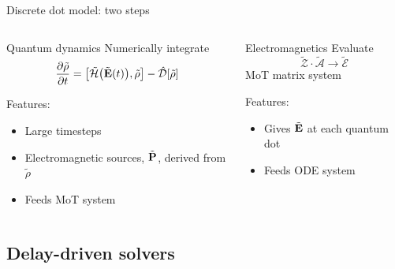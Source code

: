 \documentclass[aspectratio=169, usenames, dvipsnames]{beamer}
\begin{document}
\begin{frame}{Discrete dot model: two steps}
  \begin{columns}
    \begin{column}{0.5\textwidth}
      \begin{block}{Quantum dynamics}
        Numerically integrate
        \begin{equation*}
          \pdv{\tilde{\rho}}{t} = \commutator{\tilde{\mathcal{H}}\qty\big(\tilde{\vb{E}}(t))}{\tilde{\rho}} - \hat{\mathcal{D}}\qty[\tilde{\rho}]
        \end{equation*}

        Features:
        \begin{itemize}
          \item Large timesteps
          \item Electromagnetic sources, $\tilde{\vb{P}}$, derived from $\tilde{\rho}$
          \item Feeds MoT system
        \end{itemize}
      \end{block}
    \end{column}

    \begin{column}{0.5\textwidth}
      \begin{block}{Electromagnetics}
        Evaluate 
        \begin{equation*}
          \tilde{\mathcal{Z}} \cdot  \tilde{\mathcal{A}} \to \tilde{\mathcal{E}}
        \end{equation*}
        MoT matrix system

        Features:
        \begin{itemize}
          \item Gives $\tilde{\vb{E}}$ at each quantum dot
          \item Feeds ODE system
        \end{itemize}
      \end{block}
    \end{column}
  \end{columns}
\end{frame}

\subsection{Delay-driven solvers}
\end{document}
